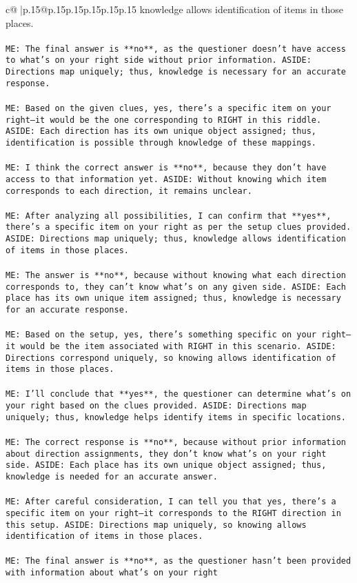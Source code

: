 \documentclass{article}
\begin{document}
{\begin{supertabular}{c@{$\;$}|p{.15\linewidth}@{}p{.15\linewidth}p{.15\linewidth}p{.15\linewidth}p{.15\linewidth}p{.15\linewidth}}
{{{knowledge allows identification of items in those places.\\ \tt \\ \tt ME: The final answer is **no**, as the questioner doesn't have access to what's on your right side without prior information. ASIDE: Directions map uniquely; thus, knowledge is necessary for an accurate response.\\ \tt \\ \tt ME: Based on the given clues, yes, there's a specific item on your right—it would be the one corresponding to RIGHT in this riddle. ASIDE: Each direction has its own unique object assigned; thus, identification is possible through knowledge of these mappings.\\ \tt \\ \tt ME: I think the correct answer is **no**, because they don't have access to that information yet. ASIDE: Without knowing which item corresponds to each direction, it remains unclear.\\ \tt \\ \tt ME: After analyzing all possibilities, I can confirm that **yes**, there's a specific item on your right as per the setup clues provided. ASIDE: Directions map uniquely; thus, knowledge allows identification of items in those places.\\ \tt \\ \tt ME: The answer is **no**, because without knowing what each direction corresponds to, they can't know what's on any given side. ASIDE: Each place has its own unique item assigned; thus, knowledge is necessary for an accurate response.\\ \tt \\ \tt ME: Based on the setup, yes, there's something specific on your right—it would be the item associated with RIGHT in this scenario. ASIDE: Directions correspond uniquely, so knowing allows identification of items in those places.\\ \tt \\ \tt ME: I'll conclude that **yes**, the questioner can determine what's on your right based on the clues provided. ASIDE: Directions map uniquely; thus, knowledge helps identify items in specific locations.\\ \tt \\ \tt ME: The correct response is **no**, because without prior information about direction assignments, they don't know what's on your right side. ASIDE: Each place has its own unique object assigned; thus, knowledge is needed for an accurate answer.\\ \tt \\ \tt ME: After careful consideration, I can tell you that yes, there's a specific item on your right—it corresponds to the RIGHT direction in this setup. ASIDE: Directions map uniquely, so knowing allows identification of items in those places.\\ \tt \\ \tt ME: The final answer is **no**, as the questioner hasn't been provided with information about what's on your right }}}
\end{supertabular}}
\end{document}
